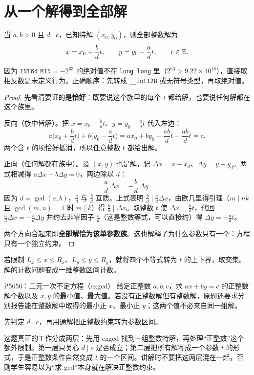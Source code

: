 \section{从一个解得到全部解}
当 $a,b>0$ 且 $d\mid c$，已知特解 $(x_0,y_0)$，则全部整数解为
\[
 x=x_0+\frac bd t,\qquad y=y_0-\frac ad t,\qquad t\in\mathbb Z.
\]

\begin{tip}
因为 $\texttt{INT64\_MIN}=-2^{63}$ 的绝对值不在 \texttt{long long} 里（$2^{63}>9.22\times10^{18}$），直接取相反数是未定义行为。正确顺序：先转成 \texttt{\_\_int128} 或无符号类型，再取绝对值。
\end{tip}

\begin{proof}
先看清要证的是\textbf{恰好}：既要说这个族里的每个 $t$ 都给解，也要说任何解都在这个族里。

反向（族中皆解）。把 $x=x_0+\frac bd t$、$y=y_0-\frac ad t$ 代入左边：
\[
 a\Big(x_0+\frac bd t\Big)+b\Big(y_0-\frac ad t\Big)=ax_0+by_0+\frac{ab}{d}t-\frac{ab}{d}t=c.
\]
两个含 $t$ 的项恰好抵消，所以任意整数 $t$ 都给出解。

正向（任何解都在族中）。设 $(x,y)$ 也是解，记 $\Delta x=x-x_0$、$\Delta y=y-y_0$。两式相减得 $a\Delta x+b\Delta y=0$，两边除以 $d$：
\[
 \frac ad\,\Delta x=-\frac bd\,\Delta y.
\]
因为 $d=\gcd(a,b)$，$\frac ad$ 与 $\frac bd$ 互质。上式表明 $\frac bd\mid\frac ad\Delta x$，由欧几里得引理（$m\mid nk$ 且 $\gcd(m,n)=1$ 时 $m\mid k$）得 $\frac bd\mid\Delta x$。取整数 $t$ 使 $\Delta x=\frac bd t$，代回 $\frac ad\Delta x=-\frac bd\Delta y$ 并约去非零因子 $\frac bd$（这是整数等式，可以直接约）得 $\Delta y=-\frac ad t$。

两个方向合起来即\textbf{全部解恰为该单参数族}。这也解释了为什么参数只有一个：方程只有一个独立约束。
\end{proof}
若限制 $L_x\le x\le R_x$、$L_y\le y\le R_y$，就将四个不等式转为 $t$ 的上下界，取交集。解的计数问题变成一维整数区间计数。

\begin{problem}{P5656：二元一次不定方程（exgcd）}
给定正整数 $a,b,c$，求 $ax+by=c$ 的正整数解个数以及 $x,y$ 的最小值、最大值。若没有正整数解但有整数解，原题还要求分别报告能在整数解中取得的最小正 $x$、最小正 $y$；这两个值不必来自同一组解。
\end{problem}
\hint 先判定 $d\mid c$，再用通解把正整数约束转为参数区间。

\begin{pitfall}[讲解：先看这题到底在做什么]
这题真正的工作分成两层：先用 exgcd 找到一组整数特解，再处理“正整数”这个额外限制。第一层只关心 $d\mid c$ 是否成立；第二层把所有解写成一个参数 $t$ 的形式，于是正整数条件自然变成 $t$ 的一个区间。讲解时不要把这两层混在一起，否则学生容易以为“求 gcd”本身就在解决正整数约束。
\end{pitfall}

